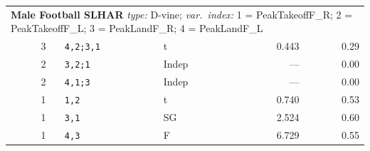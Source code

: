 {\begin{longtable}{lcllrr}
\midrule
\multicolumn{6}{l}{\textbf{Male Football SLHAR} \hfill {\footnotesize \textit{type:} D-vine; \textit{var.\ index:} 1 = PeakTakeoffF\_R; 2 = PeakTakeoffF\_L; 3 = PeakLandF\_R; 4 = PeakLandF\_L}} \\
        & 3 & \texttt{4,2;3,1} & t & 0.443 & 0.29 \\
        & 2 & \texttt{3,2;1} & Indep & --- & 0.00 \\
        & 2 & \texttt{4,1;3} & Indep & --- & 0.00 \\
        & 1 & \texttt{1,2} & t & 0.740 & 0.53 \\
        & 1 & \texttt{3,1} & SG & 2.524 & 0.60 \\
        & 1 & \texttt{4,3} & F & 6.729 & 0.55 \\
\end{longtable}
}
